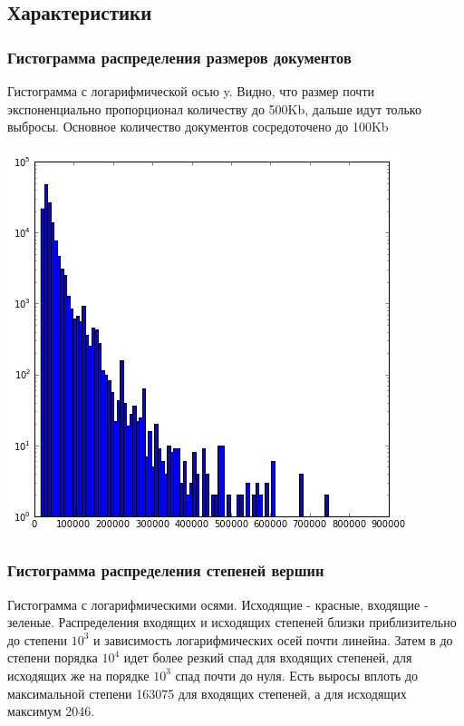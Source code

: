 \documentclass[12pt]{article}
\begin{document}
\subsection*{Характеристики}
\subsubsection*{Гистограмма распределения размеров документов}
Гистограмма с логарифмической осью y. Видно, что размер почти экспоненциально пропорционал количеству до 500Kb, дальше идут только выбросы. Основное количество документов сосредоточено до 100Kb

\includegraphics[scale=0.7]{1.png}

\subsubsection*{Гистограмма распределения степеней вершин}
Гистограмма с логарифмическими осями. Исходящие - красные, входящие - зеленые. Распределения входящих и исходящих степеней близки приблизительно до степени $10^3$ и зависимость логарифмических осей почти линейна. Затем в до степени порядка $10^4$ идет более резкий спад для входящих степеней, для исходящих же на порядке $10^3$ спад почти до нуля. Есть выросы вплоть до максимальной степени 163075 для входящих степеней, а для исходящих максимум 2046.
\end{document}
